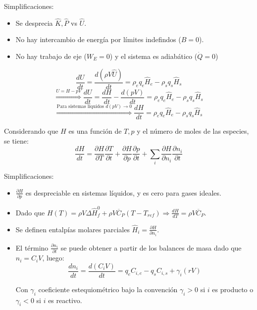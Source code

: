         Simplificaciones:
        \begin{itemize}
            \item Se desprecia \(\widehat{K},\widehat{P}\) vs \(\widehat{U}\).
            \item No hay intercambio de energía por límites indefindos (\(B=0\)).
            \item No hay trabajo de eje (\(W_{E}=0\)) y el sistema es adiabático (\(\dot{Q}=0\))
        \end{itemize}
        \[\frac{dU}{dt} = \frac{d\left ( \rho V \widehat{U} \right )}{dt} = \rho_{e} q_{e} \widehat{H}_{e} - \rho_{s} q_{s} \widehat{H}_{s}\]
        \[\overset{U=H-pV}{\Rightarrow} \frac{dU}{dt} = \frac{dH}{dt} - \frac{d\left ( pV \right )}{dt} = \rho_{e} q_{e} \widehat{H}_{e} - \rho_{s} q_{s} \widehat{H}_{s}\]
        \begin{equation}
        \label{eq:be_ns_rxn_pendiente}
            \overset{\text{Para sistemas líquidos } d(pV) \rightarrow 0}{\Rightarrow} \frac{dH}{dt} = \rho_{e} q_{e} \widehat{H}_{e} - \rho_{s} q_{s} \widehat{H}_{s}
        \end{equation}
        
        Considerando que \(H\) es una función de \(T,p\) y el número de moles de las especies, se tiene:
        \begin{equation}
        \label{eq:be_ns_rxn_cond_h}
            \frac{dH}{dt} = \frac{\partial H}{\partial T}\frac{\partial T}{\partial t} + \frac{\partial H}{\partial p}\frac{\partial p}{\partial t} + \sum_{i}\frac{\partial H}{\partial n_{i}}\frac{\partial n_{i}}{\partial t}
        \end{equation}
        \newpage
        
        Simplificaciones:
        \begin{itemize}
            \item \(\frac{\partial H}{\partial p}\) es despreciable en sistemas líquidos, y es cero para gases ideales.
            \item Dado que \(H(T) = \rho V \Delta \widehat{H}_{f}^{0} + \rho V \overline{C}_{P}\left ( T - T_{ref} \right ) \Rightarrow \frac{dH}{dT} = \rho V \overline{C}_{P}\).
            \item Se definen entalpías molares parciales \(\widehat{H}_{i} = \frac{\partial H}{\partial n_{i}}\).
            \item El término \(\frac{\partial n_{i}}{\partial t}\) se puede obtener a partir de los balances de masa dado que \(n_{i} = C_{i}V\), luego:
            \begin{equation}
            \label{eq:be_ns_rxn_cond_n}
                \frac{d n_{i}}{dt} = \frac{d(C_{i}V)}{dt} = q_{e} C_{i,e} - q_{s} C_{i,s} + \gamma_{i}(rV)
            \end{equation}
            
            Con \(\gamma_{i}\) coeficiente estequiométrico bajo la convención \(\gamma_{i} > 0\) si \(i\) es producto o \(\gamma_{i} < 0\) si \(i\) es reactivo.
        \end{itemize}
        
